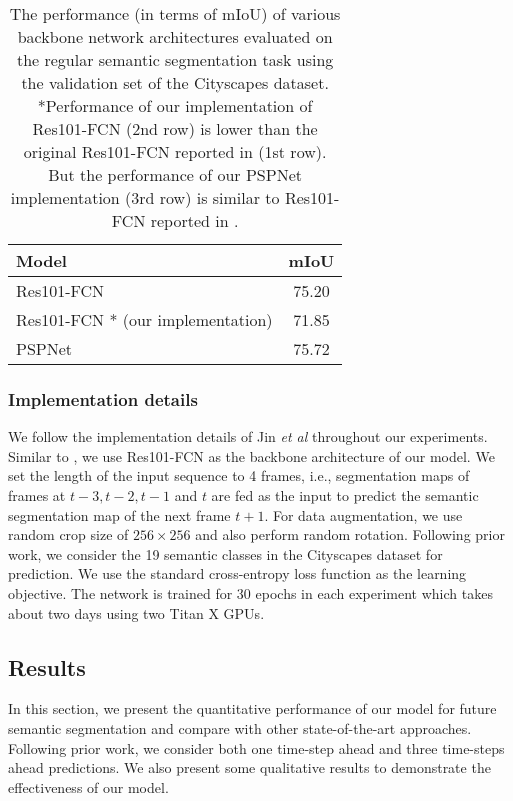 \documentclass{bmvc2k}
\def\etal{\emph{et al}\bmvaOneDot}
\begin{document}
\begin{table}[h]
	\begin{center}
		\begin{tabular}{|l|c|}
			\hline
			Model & mIoU\\
			\hline\hline
			Res101-FCN \cite{jin2017predicting}  & {75.20} \\
			Res101-FCN \cite{jin2017predicting}* (our implementation) & {71.85} \\
			PSPNet \cite{zhao2017pyramid} & {75.72} \\
			\hline
		\end{tabular}
	\end{center}
	\caption{The performance (in terms of mIoU) of various backbone network architectures evaluated on the regular semantic segmentation task using the validation set of the Cityscapes dataset. *Performance of our implementation of Res101-FCN (2nd row) is lower than the original Res101-FCN reported in \cite{jin2017predicting} (1st row). But the performance of our PSPNet implementation (3rd row) is similar to Res101-FCN reported in \cite{jin2017predicting}.}
	\label{table:seg_performance}
\end{table}\subsubsection{Implementation details}
We follow the implementation details of Jin \etal\cite{jin2017predicting} throughout our experiments. Similar to \cite{jin2017predicting}, we use Res101-FCN as the backbone architecture of our model. We set the length of the input sequence to 4 frames, i.e., segmentation maps of frames at $t-3, t-2, t-1$ and $t$ are fed as the input to predict the semantic segmentation map of the next frame $t+1$. For data augmentation, we use random crop size of $256\times256$ and also perform random rotation. Following prior work, we consider the 19 semantic classes in the Cityscapes dataset for prediction. We use the standard cross-entropy loss function as the learning objective. The network is trained for 30 epochs in each experiment which takes about two days using two Titan X GPUs.

\subsection{Results}\label{sec:results}

In this section, we present the quantitative performance of our model for future semantic segmentation and compare with other state-of-the-art approaches. Following prior work, we consider both one time-step ahead and three time-steps ahead predictions. We also present some qualitative results to demonstrate the effectiveness of our model.
\end{document}
